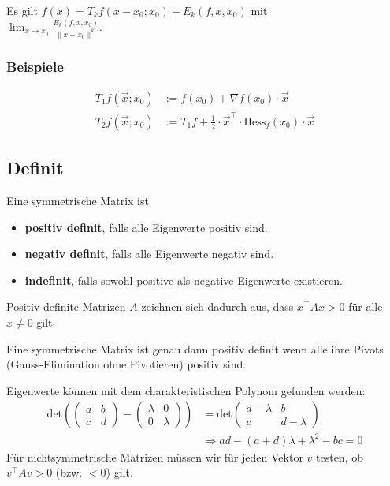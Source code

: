 \documentclass[a4paper,10pt]{article}
\begin{document}
Es gilt $f(x) = T_k f(x - x_0; x_0) + E_k(f, x, x_0)$ mit \\
$\lim_{x \to x_0} \frac{E_k(f, x, x_0)}{\lVert x - x_0 \rVert^k}$.

\subsubsection*{Beispiele}
\begin{align*}
  T_1 f(\vec{x}; x_0) &:= f(x_0) + \nabla f(x_0) \cdot \vec{x} \\
  T_2 f(\vec{x}; x_0) &:= T_1f + \frac{1}{2} \cdot \vec{x}^\top \cdot \text{Hess}_f(x_0) \cdot \vec{x}
\end{align*}

\subsection{Definit}
Eine symmetrische Matrix ist
\begin{itemize}
  \item \textbf{positiv definit}, falls alle Eigenwerte positiv sind.
  \item \textbf{negativ definit}, falls alle Eigenwerte negativ sind.
  \item \textbf{indefinit}, falls sowohl positive als negative Eigenwerte existieren.
\end{itemize}

Positiv definite Matrizen $A$ zeichnen sich dadurch aus, dass $x^\top A x > 0$ für alle $x \neq 0$ gilt.

Eine symmetrische Matrix ist genau dann positiv definit wenn alle ihre Pivots (Gauss-Elimination ohne Pivotieren) positiv sind.

Eigenwerte können mit dem charakteristischen Polynom gefunden werden:
\begin{align*}
  \text{det} \left(
  \begin{pmatrix}
    a & b\\
    c & d
  \end{pmatrix}
  -
  \begin{pmatrix}
    \lambda & 0\\
    0 & \lambda
  \end{pmatrix}
  \right)
  &=
  \text{det}
  \begin{pmatrix}
    a - \lambda & b\\
    c & d - \lambda
  \end{pmatrix}\\
  &\Rightarrow ad - (a + d) \lambda + \lambda^2 - bc = 0
\end{align*}
Für nichtsymmetrische Matrizen müssen wir für jeden Vektor \(v\) testen, ob \(v^\top A v > 0\) (bzw. \(< 0\)) gilt.
\end{document}

